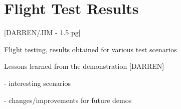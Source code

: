 \section{Flight Test Results}

[DARREN/JIM - 1.5 pg]

Flight testing, results obtained for various test scenarios

Lessons learned from the demonstration [DARREN]

- interesting scenarios

- changes/improvements for future demos